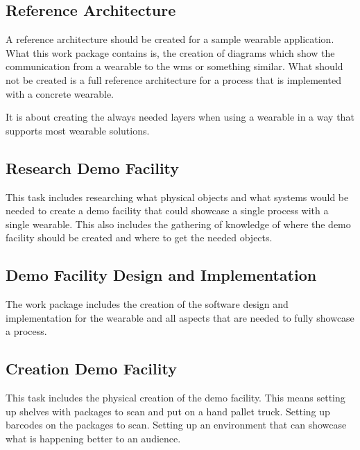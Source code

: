 \subsection{Reference Architecture}
A reference architecture should be created for a sample wearable application. What this work package contains is, the creation of diagrams which show the communication from a wearable to the \gls{wms} or something similar. What should not be created is a full reference architecture for a process that is implemented with a concrete wearable. 

It is about creating the always needed layers when using a wearable in a way that supports most wearable solutions.

\subsection{Research Demo Facility}
This task includes researching what physical objects and what systems would be needed to create a demo facility that could showcase a single process with a single wearable. This also includes the gathering of knowledge of where the demo facility should be created and where to get the needed objects.

\subsection{Demo Facility Design and Implementation}
The work package includes the creation of the software design and implementation for the wearable and all aspects that are needed to fully showcase a process.

\subsection{Creation Demo Facility}
This task includes the physical creation of the demo facility. This means setting up shelves with packages to scan and put on a hand pallet truck. Setting up barcodes on the packages to scan. Setting up an environment that can showcase what is happening better to an audience.
